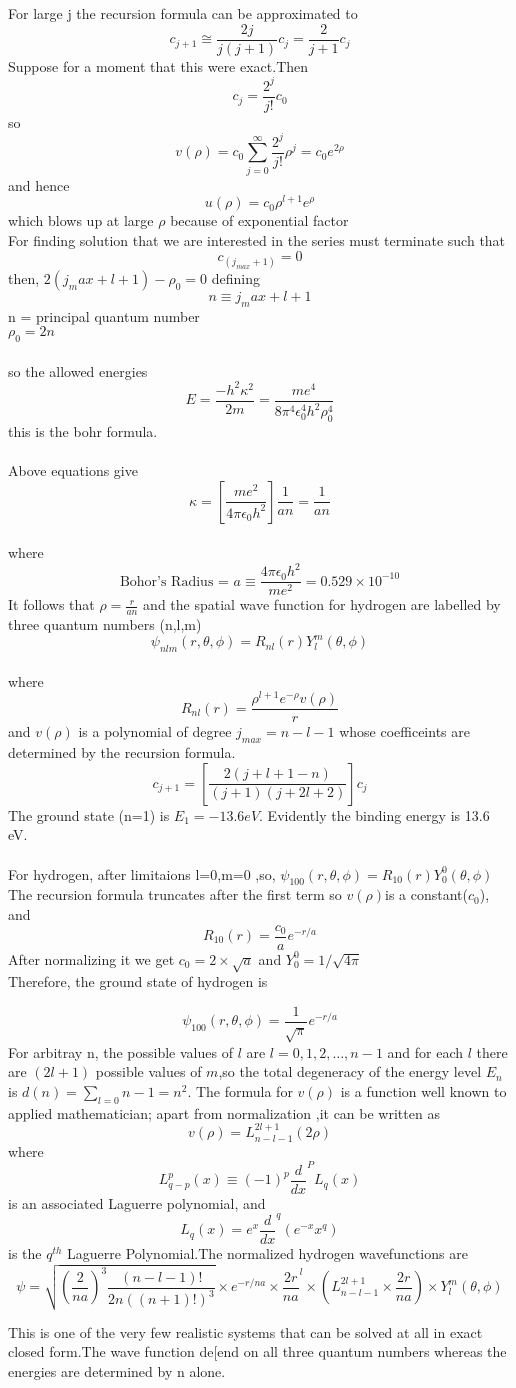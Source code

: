 \documentclass[12pt,a4paper]{report}
\begin{document}
For large j the recursion formula can be approximated to 
$$c_{j+1} \cong \frac{2j}{j(j+1)}c_j=\frac{2}{j+1}c_j$$
Suppose for a moment that this were exact.Then
$$c_j=\frac{2^j}{j!}c_0$$ 
so 
$$v(\rho)=c_0\sum_{j=0}^{\infty}\frac{2^j}{j!}\rho^j=c_0e^{2\rho}$$
and hence 
$$u(\rho)=c_0\rho^{l+1}e^\rho$$
 which blows up at large $\rho$ because of exponential factor \\
For finding solution that we are interested in the series must terminate such that\\ 
$$c_{(j_{max} +1)}=0 $$ 
then,  $2(j_max +l+1)-\rho_0=0$ 
defining
$$n\equiv j_max +l+1$$ 
n = principal quantum number\\
$\rho_0=2n$\\ \\
so the allowed energies 
$$E=\frac{-h^2\kappa^2}{2m}=\frac{me^4}{8\pi^4\epsilon_0^4 h^2 \rho_0^4}$$
this is the bohr formula.\\ \\
Above equations give $$\kappa=\left[\frac{me^2}{4\pi\epsilon_0 h^2}\right]\frac{1}{an}=\frac{1}{an}$$\\
where $$\text{Bohor's Radius = }a\equiv\frac{4\pi\epsilon_0 h^2}{me^2}=0.529 \times 10^{-10}$$
It follows that 
$\rho =\frac{r}{an}$
and the spatial wave function for hydrogen are labelled by three quantum numbers (n,l,m)
$$\psi_{nlm}(r,\theta,\phi)=R_{nl}(r)Y^m_l(\theta,\phi)$$  \\
where 
$$R_{nl}(r)=\frac{\rho^{l+1}e^{-\rho}v(\rho)}{r}$$
and $v(\rho)$  is a polynomial of degree $ j_{max}=n-l-1 $ whose coefficeints are determined by the recursion formula.
$$c_{j+1}=\left[\frac{2(j+l+1-n)}{(j+1)(j+2l+2)}\right]c_j$$
The ground state (n=1) is 
$E_1=-13.6eV$.
Evidently the binding energy is 13.6 eV.\\\\
For hydrogen,  after limitaions l=0,m=0 ,so,
$\psi_{100}(r,\theta,\phi)=R_{10}(r)Y^0_0(\theta,\phi)$  \\
The recursion formula truncates after the first term so $v(\rho) $is a constant($c_0$), and \\
$$R_{10}(r)=\frac{c_0}{a}e^{-r/a}$$ 
After normalizing it we get $c_0 =2\times \sqrt{a}$ and  $Y^{0}_0 =1/{\sqrt{4\pi}}$\\
Therefore, the ground state of hydrogen is 

$$\psi_{100}(r,\theta,\phi)=\frac{1}{\sqrt{\pi}}e^{-r/a}$$
For arbitray n, the possible values of $l$ are
 $l=0,1,2,\ldots,n-1$
and for each $l$ there are $(2l+1)$ possible values of $m$,so the total degeneracy of the energy level $E_n$ is
$d(n)=\sum_{l=0}{n-1}=n^2$.
The formula for $v(\rho)$ is a function well known to applied mathematician; apart from normalization ,it can be written as
$$v(\rho)=L^{2l+1}_{n-l-1}(2\rho)$$
where 
$$L^{p}_{q-p}(x) \equiv (-1)^p\frac{d}{dx}^P L_q(x)$$
is an associated Laguerre polynomial, and
$$ L_q(x)=e^x{\frac{d}{dx}}^q (e^{-x}x^q)$$
is the $q^{th}$ Laguerre Polynomial.The normalized hydrogen wavefunctions are 
$$\psi=\sqrt{\left(\frac{2}{na}\right)^3 {\frac{(n-l-1)!}{2n((n+1)!)^3}}}
 \times e^{-r/na}\times{\frac{2r}{na}}^l\times  \left(L^{2l+1}_{n-l-1}\times\frac{2r}{na}\right)\times Y^{m}_l(\theta,\phi)$$ 


This is one of the very few realistic systems that can be solved at all in exact closed form.The wave function de[end on all three
quantum numbers whereas the energies are determined by n alone.\\
\end{document}
